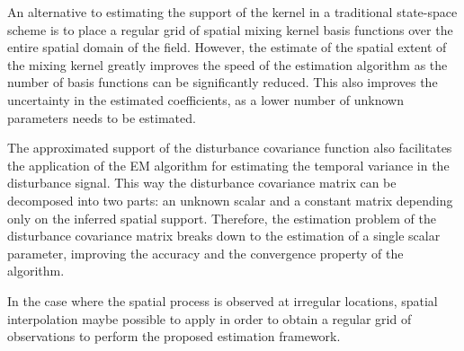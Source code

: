 \documentclass[10pt,twocolumn,twoside]{IEEEtran}
\begin{document}
{An alternative to estimating the support of the kernel in a traditional state-space scheme is to place a regular grid of spatial mixing kernel basis functions over the entire spatial domain of the field. However, the estimate of the spatial extent of the mixing kernel greatly improves the speed of the estimation algorithm as the number of basis functions can be significantly reduced. This also improves the uncertainty in the estimated coefficients, as a lower number of unknown parameters needs to be estimated. 

The approximated support of the disturbance covariance function also facilitates the application of the EM algorithm for estimating the temporal variance in the disturbance signal. This way the disturbance covariance matrix can be decomposed into two parts: an unknown scalar and a constant matrix depending only on the inferred spatial support. Therefore, the estimation problem of the disturbance covariance matrix breaks down to the estimation of a single scalar parameter, improving the accuracy and the convergence property of the algorithm.

In the case where the spatial process is observed at irregular locations, spatial interpolation maybe possible to apply in order to obtain a regular grid of observations to perform the proposed estimation framework.




 \appendices  %
}
\end{document}
